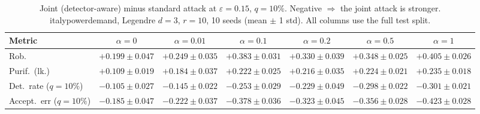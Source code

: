 \begin{table}[htbp]
  \centering
  \small
  \begin{tabular}{@{}lcccccc@{}}
    \toprule
    Metric & $\alpha{=}0$ & $\alpha{=}0.01$ & $\alpha{=}0.1$ & $\alpha{=}0.2$ & $\alpha{=}0.5$ & $\alpha{=}1$ \\
    \midrule
    Rob. & $+0.199 \pm 0.047$ & $+0.249 \pm 0.035$ & $+0.383 \pm 0.031$ & $+0.330 \pm 0.039$ & $+0.348 \pm 0.025$ & $+0.405 \pm 0.026$ \\
    Purif.\ (lk.) & $+0.109 \pm 0.019$ & $+0.184 \pm 0.037$ & $+0.222 \pm 0.025$ & $+0.216 \pm 0.035$ & $+0.224 \pm 0.021$ & $+0.235 \pm 0.018$ \\
    Det.\ rate ($q{=}10\%$) & $-0.105 \pm 0.027$ & $-0.145 \pm 0.022$ & $-0.253 \pm 0.029$ & $-0.229 \pm 0.049$ & $-0.298 \pm 0.022$ & $-0.301 \pm 0.021$ \\
    Accept.\ err ($q{=}10\%$) & $-0.185 \pm 0.047$ & $-0.222 \pm 0.037$ & $-0.378 \pm 0.036$ & $-0.323 \pm 0.045$ & $-0.356 \pm 0.028$ & $-0.423 \pm 0.028$ \\
    \bottomrule
  \end{tabular}
  \caption{Joint (detector-aware) minus standard attack at $\varepsilon=0.15$, $q{=}10\%$. Negative $\Rightarrow$ the joint attack is stronger. italypowerdemand, Legendre $d{=}3$, $r{=}10$, 10 seeds (mean $\pm$ 1 std). All columns use the full test split.}
  \label{tab:italypowerdemand_joint_r10_eps0.15}
\end{table}
